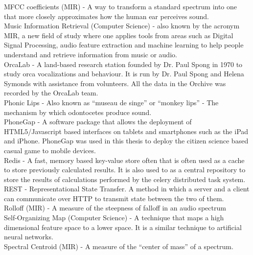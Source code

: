 \documentclass[12pt,oneside]{book}
\begin{document}
MFCC coefficients (MIR) - A way to transform a standard spectrum into
one that more closely approximates how the human ear perceives sound.\\ 

Music Information Retrieval (Computer Science) - also known by the
acronym MIR, a new field of study where one applies tools from areas
such as Digital Signal Processing, audio feature extraction and
machine learning to help people understand and retrieve information
from music or audio.  \\

OrcaLab - A land-based research station founded by Dr. Paul Spong in
1970 to study orca vocalizations and behaviour.  It is run by Dr. Paul
Spong and Helena Symonds with assistance from volunteers.  All the
data in the Orchive was recorded by the OrcaLab team.\\

Phonic Lips - Also known as ``museau de singe'' or ``monkey lips'' -
The mechanism by which odontocetes produce sound. \\

PhoneGap - A software package that allows the deployment of
HTML5/Javascript based interfaces on tablets and smartphones such as
the iPad and iPhone.  PhoneGap was used in this thesis to deploy the
citizen science based casual game to mobile devices. \\

Redis - A fast, memory based key-value store often that is often used
as a cache to store previously calculated results.   It is also used to
as a central repository to store the results of calculations performed
by the celery distributed task system.\\

REST - Representational State Transfer.  A method in which a server
and a client can communicate over HTTP to transmit state between the
two of them. \\

Rolloff (MIR) - A measure of the steepness of falloff in an audio
spectrum \\

Self-Organizing Map (Computer Science) - A technique that maps a high
dimensional feature space to a lower space.  It is a similar technique
to artificial neural networks.\\

Spectral Centroid (MIR) - A measure of the ``center of mass'' of a
spectrum.  \\
\end{document}
